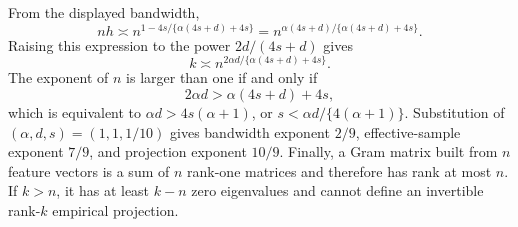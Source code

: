 From the displayed bandwidth,
\[
nh\asymp n^{1-4s/\{\alpha(4s+d)+4s\}}
=n^{\alpha(4s+d)/\{\alpha(4s+d)+4s\}}.
\]
Raising this expression to the power \(2d/(4s+d)\) gives
\[
k\asymp n^{2\alpha d/\{\alpha(4s+d)+4s\}}.
\]
The exponent of \(n\) is larger than one if and only if
\[
2\alpha d>\alpha(4s+d)+4s,
\]
which is equivalent to \(\alpha d>4s(\alpha+1)\), or \(s<\alpha d/\{4(\alpha+1)\}\). Substitution of \((\alpha,d,s)=(1,1,1/10)\) gives bandwidth exponent \(2/9\), effective-sample exponent \(7/9\), and projection exponent \(10/9\). Finally, a Gram matrix built from \(n\) feature vectors is a sum of \(n\) rank-one matrices and therefore has rank at most \(n\). If \(k>n\), it has at least \(k-n\) zero eigenvalues and cannot define an invertible rank-\(k\) empirical projection.